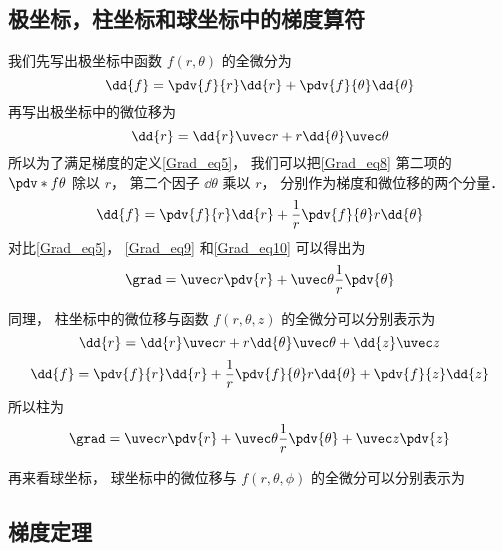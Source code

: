 \subsection{极坐标，柱坐标和球坐标中的梯度算符}

我们先写出极坐标中函数 $f(r,\theta)$ 的全微分为
\begin{equation}\label{Grad_eq8}
\dd{f} = \pdv{f}{r} \dd{r} + \pdv{f}{\theta} \dd{\theta}
\end{equation}
再写出极坐标中的微位移为%
\begin{equation}\label{Grad_eq9}
\dd{r} = \dd{r} \uvec r + r \dd{\theta} \uvec \theta
\end{equation}
所以为了满足梯度的定义\autoref{Grad_eq5}， 我们可以把\autoref{Grad_eq8} 第二项的 $\pdv*{f}{\theta}$ 除以 $r$， 第二个因子 $\dd{\theta}$ 乘以 $r$， 分别作为梯度和微位移的两个分量．
\begin{equation}\label{Grad_eq10}
\dd{f} = \pdv{f}{r} \dd{r} + \frac 1r \pdv{f}{\theta}  r\dd{\theta}
\end{equation}
对比\autoref{Grad_eq5}， \autoref{Grad_eq9} 和\autoref{Grad_eq10} 可以得出为
\begin{equation}
\grad = \uvec r \pdv{r} + \uvec \theta \frac 1r \pdv{\theta}
\end{equation}

同理， 柱坐标中的微位移与函数 $f(r,\theta, z)$ 的全微分可以分别表示为
\begin{equation}
\dd{r} = \dd{r} \uvec r + r\dd{\theta} \uvec \theta + \dd{z} \uvec z
\end{equation}
\begin{equation}
\dd{f} = \pdv{f}{r} \dd{r} + \frac 1r \pdv{f}{\theta}  r\dd{\theta} + \pdv{f}{z} \dd{z}
\end{equation}
所以柱为
\begin{equation}
\grad = \uvec r \pdv{r} + \uvec \theta \frac 1r \pdv{\theta} + \uvec z \pdv{z}
\end{equation}

再来看球坐标， 球坐标中的微位移与 $f(r,\theta,\phi)$ 的全微分可以分别表示为



\subsection{梯度定理}

